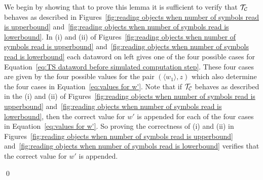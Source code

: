 \documentclass[11pt]{article} \usepackage{amsfonts,amsmath,amssymb,amsthm}
\renewenvironment{proof}{{\bfseries\noindent Proof.}}{\qed\vspace{3.5ex}}
\newcommand{\tne}[1]{\ensuremath{\langle #1\rangle}}
\begin{document}
\begin{proof}
We begin by showing that to prove this lemma it is sufficient to verify that $\mathcal{T_{\mathcal{C}}}$ behaves as described in Figures~\ref{fig:reading objects when number of symbols read is upperbound} and~\ref{fig:reading objects when number of symbols read is lowerbound}. 
In (i) and (ii) of Figures~\ref{fig:reading objects when number of symbols read is upperbound} and~\ref{fig:reading objects when number of symbols read is lowerbound} each dataword on left gives one of the four possible cases for Equation~\eqref{eq:TS dataword before simulated computation step}. 
These four cases are given by the four possible values for the pair $(\tne{w_1},z)$ which also determine the four cases in Equation~\eqref{eq:values for w'}. 
Note that if $\mathcal{T_{\mathcal{C}}}$ behaves as described in the (i) and (ii) of Figures~\ref{fig:reading objects when number of symbols read is upperbound} and~\ref{fig:reading objects when number of symbols read is lowerbound}, then the correct value for $w'$ is appended for each of the four cases in Equation~\eqref{eq:values for w'}.
So proving the correctness of (i) and (ii) in Figures~\ref{fig:reading objects when number of symbols read is upperbound} and~\ref{fig:reading objects when number of symbols read is lowerbound} verifies that the correct value for $w'$ is appended. 


\end{proof}
\end{document}
